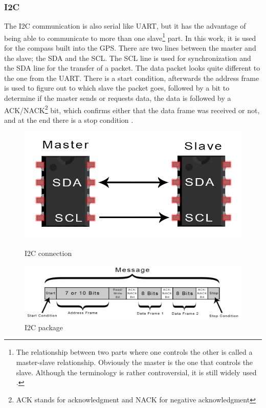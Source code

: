 \documentclass[svgnames]{article}
\begin{document}
	\subsubsection{I2C}
	The \gls{I2C} communication is also serial like \gls{UART}, but it has the advantage of being able to communicate to more than one slave\footnote{The relationship between two parts where one controls the other is called a master-slave relationship. Obviously the master is the one that controls the slave. Although the terminology is rather controversial, it is still widely used \cite{masterslave}.} part. In this work, it is used for the compass built into the \gls{GPS}. There are two lines between the master and the slave; the \gls{SDA} and the \gls{SCL}. The \gls{SCL} line is used for synchronization and the \gls{SDA} line for the transfer of a packet. The data packet looks quite different to the one from the \gls{UART}. There is a start condition, afterwards the address frame is used to figure out to which slave the packet goes, followed by a bit to determine if the master sends or requests data, the data is followed by a ACK/NACK\footnote{ACK stands for acknowledgment and NACK for negative acknowledgment} bit, which confirms either that the data frame was received or not, and at the end there is a stop condition \cite{i2cprotocol}.
\begin{figure}[ht]
	\begin{minipage}[c]{0.4\textwidth}
		\includegraphics[width=\textwidth]{pictures/I2Cconnection}
		\caption{\gls{I2C} connection \cite{i2cprotocol}}
		\label{fig:I2Cconnection}
	\end{minipage}
	\hfill
	\begin{minipage}[c]{0.4\textwidth}
		\includegraphics[width=\textwidth]{pictures/I2Cpackage}
		\caption{\gls{I2C} package \cite{i2cprotocol}}
		\label{fig:I2Cpackage}
	\end{minipage}
\end{figure}
\end{document}
